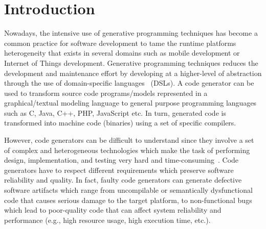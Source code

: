 \section{Introduction}

\enlargethispage{0.5cm}


Nowadays, the intensive use of generative programming techniques has become a common practice for software development to tame the runtime platforms heterogeneity that exists in several domains such as mobile development or Internet of Things development.  Generative programming techniques reduces the development and maintenance effort by developing at a higher-level of abstraction through the use of domain-specific languages~\cite{brambilla2012model} (DSLs). 
A code generator can be used to transform source code programs/models represented in a graphical/textual modeling language to general purpose programming languages such as C, Java, C++, PHP, JavaScript etc. In turn, generated code is transformed into machine code (binaries) using a set of specific compilers.


However, code generators can be difficult to understand since they involve a set of complex and heterogeneous technologies which make the task of performing design, implementation, and testing very hard and time-consuming~\cite{france2007model,guana2015developers}. Code generators have to respect different requirements which preserve software reliability and quality. In fact, faulty code generators can generate defective software artifacts which range from uncompilable or semantically dysfunctional code that causes serious damage to the target platform, to non-functional bugs which lead to poor-quality code that can affect system reliability and performance (e.g., high resource usage, high execution time, etc.). 

